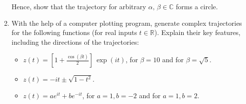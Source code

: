 \documentclass[10pt,a4paper]{article}
\begin{document}
\begin{enumerate}
  Hence, show that the trajectory for arbitrary $\alpha,\, \beta \in
  \mathbb{C}$ forms a circle.

\item
  With the help of a computer plotting program, generate complex
  trajectories for the following functions (for real inputs $t
  \in\mathbb{R}$). Explain their key features, including the
  directions of the trajectories:
  \begin{itemize}
  \item
    $z(t) = \left[1+\frac{\cos(\beta t)}{2}\right] \, \exp(it)$, for
$\beta = 10$ and for $\beta = \sqrt{5}$.
  \item
$z(t) = -it \pm \sqrt{1 - t^2}$.
    \item
$z(t) = ae^{it} + be^{-it}$, for $a = 1, b = -2$ and for
$a = 1, b = 2$.
  \end{itemize}
\end{enumerate}
\end{document}
